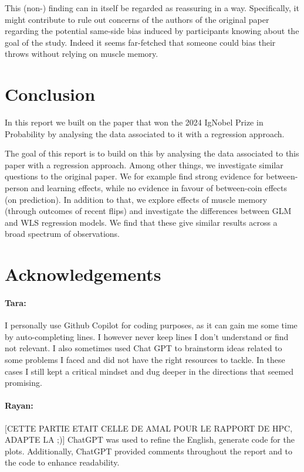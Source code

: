 \documentclass[a4paper, 12pt,oneside]{article}
\begin{document}
		This (non-) finding can in itself be regarded as reassuring in a way. Specifically, it might contribute to rule out concerns of the authors of the original paper regarding the potential same-side bias induced by participants knowing about the goal of the study. Indeed it seems far-fetched that someone could bias their throws without relying on muscle memory. 
	\section{Conclusion}
		In this report we built on the paper that won the 2024 IgNobel Prize in Probability by analysing the data associated to it with a regression approach. 

		The goal of this report is to build on this by analysing the data associated to this paper with a regression approach. Among other things, we investigate similar questions to the original paper. We for example find strong evidence for between-person and learning effects, while no evidence in favour of between-coin effects (on prediction). In addition to that, we explore effects of muscle memory (through outcomes of recent flips) and investigate the differences between GLM and WLS regression models. We find that these give similar results across a broad spectrum of observations.
	\section*{Acknowledgements}
		\paragraph{Tara:}
		I personally use Github Copilot for coding purposes, as it can gain me some time by auto-completing lines. I however never keep lines I don't understand or find not relevant. I also sometimes used Chat GPT to brainstorm ideas related to some problems I faced and did not have the right resources to tackle. In these cases I still kept a critical mindset and dug deeper in the directions that seemed promising.
		\paragraph{Rayan:}
		[CETTE PARTIE ETAIT CELLE DE AMAL POUR LE RAPPORT DE HPC, ADAPTE LA ;)]
		ChatGPT was used to refine the English, generate code for the plots. Additionally, ChatGPT provided comments throughout the report and to the code to enhance readability.
\end{document}
